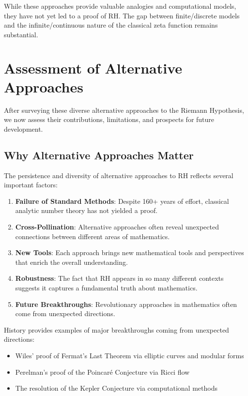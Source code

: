 \begin{limitation}
While these approaches provide valuable analogies and computational models, they have not yet led to a proof of RH. The gap between finite/discrete models and the infinite/continuous nature of the classical zeta function remains substantial.
\end{limitation}

\section{Assessment of Alternative Approaches}
\label{sec:assessment}

After surveying these diverse alternative approaches to the Riemann Hypothesis, we now assess their contributions, limitations, and prospects for future development.

\subsection{Why Alternative Approaches Matter}

The persistence and diversity of alternative approaches to RH reflects several important factors:

\begin{enumerate}
\item \textbf{Failure of Standard Methods}: Despite 160+ years of effort, classical analytic number theory has not yielded a proof.

\item \textbf{Cross-Pollination}: Alternative approaches often reveal unexpected connections between different areas of mathematics.

\item \textbf{New Tools}: Each approach brings new mathematical tools and perspectives that enrich the overall understanding.

\item \textbf{Robustness}: The fact that RH appears in so many different contexts suggests it captures a fundamental truth about mathematics.

\item \textbf{Future Breakthroughs}: Revolutionary approaches in mathematics often come from unexpected directions.
\end{enumerate}

\begin{historical}
History provides examples of major breakthroughs coming from unexpected directions:
\begin{itemize}
\item Wiles' proof of Fermat's Last Theorem via elliptic curves and modular forms
\item Perelman's proof of the Poincaré Conjecture via Ricci flow
\item The resolution of the Kepler Conjecture via computational methods
\end{itemize}
\end{historical}

